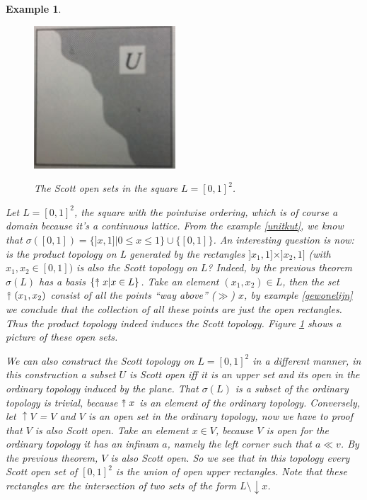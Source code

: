 \documentclass[a4paper,12pt]{article}
\newcommand{\upuparrow}{\mathrel{\reflectbox{\rotatebox[origin=c]{90}{$\twoheadrightarrow$}}}}
\newtheorem{example}[theorem]{Example}
\begin{document}
\begin{example}
\begin{figure}
  \centering
  \includegraphics[scale=0.6]{scottopen.jpg}\\
  \caption{The Scott open sets in the square $L = [0, 1]^2$.}\label{scottplane}
\end{figure}

Let $L = [0, 1]^2$, the square with the pointwise ordering, which is of course a domain because it's a continuous lattice. From the example \ref{unitkut}, we know that $\sigma([0,1]) = \{]x, 1] | 0 \leq x \leq 1 \} \cup \{[0,1]\}$. An interesting question is now: is the product topology on L generated by the rectangles $]x_1, 1] \times ]x_2, 1]$ (with $x_1, x_2 \in [0, 1])$ is also the Scott topology on $L$? Indeed, by the previous theorem $\sigma(L)$ has a basis $\{\upuparrow x | x \in L\}$. Take an element $(x_1, x_2) \in L$, then the set $\upuparrow (x_1,x_2)$ consist of all the points ``way above'' ($\gg$) $x$, by example \ref{gewonelijn} we conclude that the collection of all these points are just the open rectangles. Thus the product topology indeed induces the Scott topology. Figure \ref{scottplane} shows a picture of these open sets.

We can also construct the Scott topology on $L = [0,1]^2$ in a different manner, in this construction a subset $U$ is Scott open iff it is an upper set and its open in the ordinary topology induced by the plane.  That $\sigma(L)$ is a subset of the ordinary topology is trivial, because $\upuparrow x$ is an element of the ordinary topology. Conversely, let $\uparrow V$ = $V$ and $V$ is an open set in the ordinary topology, now we have to proof that $V$ is also Scott open. Take an element $x \in V$, because $V$ is open for the ordinary topology it has an infinum $a$, namely the left corner such that $a \ll v$. By the previous theorem, $V$ is also Scott open.   So we see that in this topology every Scott open set of $[0,1]^2$ is the union of open upper rectangles. Note that these rectangles are the intersection of two sets of the form $L\setminus \downarrow x$.
\end{example}
\end{document}

